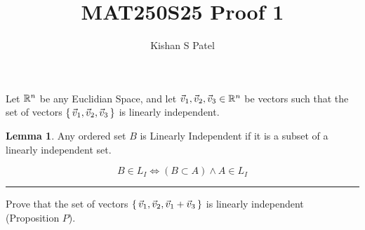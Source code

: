 \documentclass{exam}
\theoremstyle{plain}
\theoremstyle{definition}
\newtheorem{lemma}{Lemma}
\begin{document}
\title{MAT250S25 Proof 1}
\author{Kishan S Patel}
\maketitle



Let ${\mathbb R}^n$ be any Euclidian Space, and let $\vec v_1, \vec v_2, \vec v_3 \in {\mathbb R}^n$ be vectors such that the set
of vectors $\set{\vec v_1, \vec v_2, \vec v_3}$ is linearly independent.

\begin{lemma}
	Any ordered set $B$ is Linearly Independent if it is a subset of a linearly independent set.

	$$B \in L_I \iff  (B \subset A)  \wedge A \in L_I $$

	\label{subset}
\end{lemma}
\noindent \rule{\textwidth}{1pt}
\linebreak
Prove that the set of vectors $\set{\vec v_1, \vec v_2, \vec v_1 + \vec v_3}$ is linearly independent (Proposition $P$).

\renewcommand\qedsymbol{QED}


\end{document}
